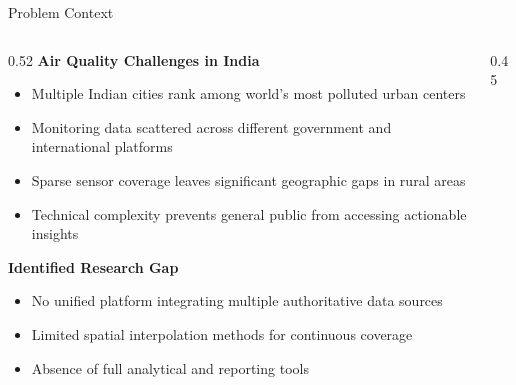 \documentclass[aspectratio=169,10pt]{beamer}
\begin{document}
\begin{frame}{Problem Context}
\begin{columns}[T]
    \begin{column}{0.52\textwidth}
        \textbf{\color{primaryblue}Air Quality Challenges in India}
        \vspace{0.15cm}

        \small
        \begin{itemize}\setlength{\itemsep}{3pt}
            \item Multiple Indian cities rank among world's most polluted urban centers
            \item Monitoring data scattered across different government and international platforms
            \item Sparse sensor coverage leaves significant geographic gaps in rural areas
            \item Technical complexity prevents general public from accessing actionable insights
        \end{itemize}

        \vspace{0.25cm}
        \textbf{\color{primaryblue}Identified Research Gap}
        \vspace{0.1cm}

        \begin{itemize}\setlength{\itemsep}{3pt}
            \item No unified platform integrating multiple authoritative data sources
            \item Limited spatial interpolation methods for continuous coverage
            \item Absence of full analytical and reporting tools
        \end{itemize}
    \end{column}

    \begin{column}{0.45\textwidth}


\end{column}
\end{columns}
\end{frame}
\end{document}
